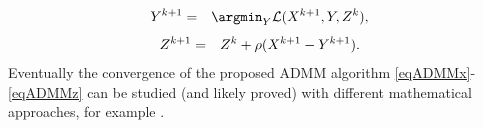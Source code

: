 \documentclass{article}
\begin{document}
\vspace{-0.5cm}
\begin{eqnarray}
Y^{k+1} &=& \argmin_Y \mathcal{L}(X^{k+1},Y,Z^k) \label{eqADMMy}, 
\end{eqnarray}
\vspace{-0.5cm}
\begin{eqnarray}
Z^{k+1} &=& Z^k + \rho ( X^{k+1} - Y^{k+1} ) \label{eqADMMz}.
\vspace{-0.1cm}
\end{eqnarray}
Eventually the convergence of the proposed ADMM algorithm \eqref{eqADMMx}-\eqref{eqADMMz} can be studied (and likely proved) with different mathematical approaches, for example \cite{cai2010singular}.




\end{document}
